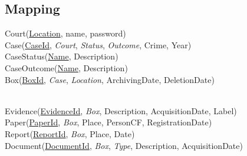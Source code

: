 \subsection{Mapping}

Court(\underline{Location}, name, password) \\
Case(\underline{CaseId}, \textit{Court}, \textit{Status}, \textit{Outcome}, Crime, Year) \\
CaseStatus(\underline{Name}, Description) \\
CaseOutcome(\underline{Name}, Description) \\
Box(\underline{BoxId}, \textit{Case}, \textit{Location}, ArchivingDate, DeletionDate)

\noindent \\
Evidence(\underline{EvidenceId}, \textit{Box}, Description, AcquisitionDate, Label) \\
Paper(\underline{PaperId}, \textit{Box}, Place, PersonCF, RegistrationDate) \\
Report(\underline{ReportId}, \textit{Box}, Place, Date) \\
Document(\underline{DocumentId}, \textit{Box}, \textit{Type}, Description, AcquisitionDate) \\
